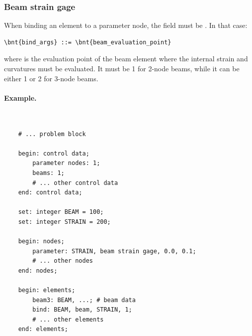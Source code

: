 \subsubsection{Beam strain gage}
When binding an element to a
parameter node, the  field must be .
In that case:
\begin{Verbatim}[commandchars=\\\{\}]
    \bnt{bind_args} ::= \bnt{beam_evaluation_point}
\end{Verbatim}
where  is the evaluation point of the beam element
where the internal strain and curvatures must be evaluated.
It must be 1 for 2-node beams, while it can be either 1 or 2
for 3-node beams.

\paragraph{Example.} \
\begin{verbatim}
    # ... problem block

    begin: control data;
        parameter nodes: 1;
        beams: 1;
        # ... other control data
    end: control data;

    set: integer BEAM = 100;
    set: integer STRAIN = 200;

    begin: nodes;
        parameter: STRAIN, beam strain gage, 0.0, 0.1;
        # ... other nodes
    end: nodes;

    begin: elements;
        beam3: BEAM, ...; # beam data
        bind: BEAM, beam, STRAIN, 1;
        # ... other elements
    end: elements;
\end{verbatim}



